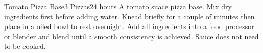 \documentclass[11pt]{article}
\begin{document}
\begin{recipe}[TomatoPizzaBase]{Tomato Pizza Base}{3 Pizzas}{24 hours}
    \freeform A tomato suace pizza base.
    Mix dry ingredients first before adding water. Knead briefly for a couple of minutes then place in a oiled bowl to rest overnight.
    Add all ingredients into a food processor or blender and blend until a smooth consistency is achieved. Sauce does not need to be cooked.
    \freeform\hrulefill
\end{recipe}
\end{document}
